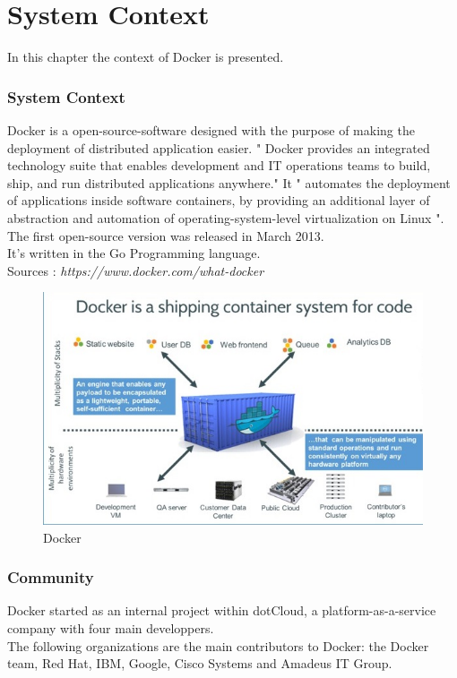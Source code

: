 \chapter{System Context}
\label{ch:context}

In this chapter the context of Docker is presented.

\subsection{System Context}
Docker is a open-source-software designed with the purpose of making the deployment of distributed application easier.
 " Docker provides an integrated technology suite that enables development and IT operations teams to build, ship, and run distributed applications anywhere."
It " automates the deployment of applications inside software containers, by providing an additional layer of abstraction and automation of operating-system-level virtualization on Linux ". \\
The first open-source version was released in March 2013. \\
It's written in the Go Programming language. \\

Sources : \textit{https://www.docker.com/what-docker}

\begin{figure}[H]
\centering
\includegraphics[scale=0.8]{images/docker_container.jpeg}
\caption{Docker}
\label{fig:analysis-mvc}
\end{figure}

\subsection{Community}
Docker started as an internal project within dotCloud, a platform-as-a-service company with four main developpers. \\
The following organizations are the main contributors to Docker: the Docker team, Red Hat, IBM, Google, Cisco Systems and Amadeus IT Group. \\